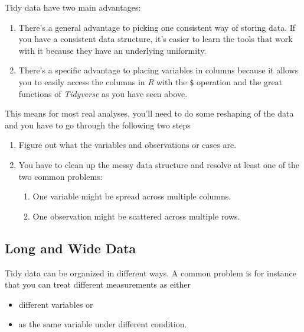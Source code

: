 \documentclass[
]{scrartcl}
\providecommand{\tightlist}{%
  \setlength{\itemsep}{0pt}\setlength{\parskip}{0pt}}
\begin{document}
Tidy data have two main advantages:

\begin{enumerate}
\def\labelenumi{\arabic{enumi}.}
\tightlist
\item
  There's a general advantage to picking one consistent way of storing data. If you have a consistent data structure, it's easier to learn the tools that work with it because they have an underlying uniformity.
\item
  There's a specific advantage to placing variables in columns because it allows you to easily access the columns in \emph{R} with the \texttt{\$} operation and the great functions of \emph{Tidyverse} as you have seen above.
\end{enumerate}

This means for most real analyses, you'll need to do some reshaping of the data and you have to go through the following two steps

\begin{enumerate}
\def\labelenumi{\arabic{enumi}.}
\tightlist
\item
  Figure out what the variables and observations or cases are.
\item
  You have to clean up the messy data structure and resolve at least one of the two common problems:

  \begin{enumerate}
  \def\labelenumii{\alph{enumii}.}
  \tightlist
  \item
    One variable might be spread across multiple columns.
  \item
    One observation might be scattered across multiple rows.
  \end{enumerate}
\end{enumerate}

\hypertarget{long-and-wide-data}{%
\subsection{Long and Wide Data}\label{long-and-wide-data}}

Tidy data can be organized in different ways. A common problem is for instance that you can treat different measurements as either

\begin{itemize}
\tightlist
\item
  different variables or
\item
  as the same variable under different condition.
\end{itemize}
\end{document}
